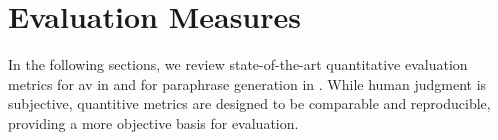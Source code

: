 \section{Evaluation Measures}
\label{sec:evaluation_measures}

In the following sections, we review state-of-the-art quantitative evaluation metrics for \ac{av} in  and for paraphrase generation in .
While human judgment is subjective, quantitive metrics are designed to be comparable and reproducible, providing a more objective basis for evaluation.





